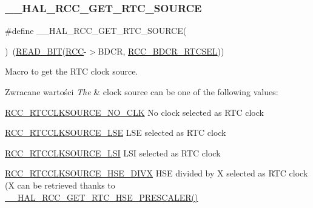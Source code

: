 \subsubsection{\texorpdfstring{\+\_\+\+\_\+\+H\+A\+L\+\_\+\+R\+C\+C\+\_\+\+G\+E\+T\+\_\+\+R\+T\+C\+\_\+\+S\+O\+U\+R\+CE}{\_\_HAL\_RCC\_GET\_RTC\_SOURCE}}
{\footnotesize\ttfamily \#define \+\_\+\+\_\+\+H\+A\+L\+\_\+\+R\+C\+C\+\_\+\+G\+E\+T\+\_\+\+R\+T\+C\+\_\+\+S\+O\+U\+R\+CE(\begin{DoxyParamCaption}{ }\end{DoxyParamCaption})~(\hyperlink{group___exported__macro_ga822bb1bb9710d5f2fa6396b84e583c33}{R\+E\+A\+D\+\_\+\+B\+IT}(\hyperlink{group___peripheral__declaration_ga74944438a086975793d26ae48d5882d4}{R\+CC}-\/$>$B\+D\+CR, \hyperlink{group___peripheral___registers___bits___definition_gabe30dbd38f6456990ee641648bc05d40}{R\+C\+C\+\_\+\+B\+D\+C\+R\+\_\+\+R\+T\+C\+S\+EL}))}



Macro to get the R\+TC clock source. 


\begin{DoxyRetVals}{Zwracane wartości}
{\em The} & clock source can be one of the following values\+: \begin{DoxyItemize}
\item \hyperlink{group___r_c_c___r_t_c___clock___source_gacce0b2f54d103340d8c3a218e86e295d}{R\+C\+C\+\_\+\+R\+T\+C\+C\+L\+K\+S\+O\+U\+R\+C\+E\+\_\+\+N\+O\+\_\+\+C\+LK} No clock selected as R\+TC clock \item \hyperlink{group___r_c_c___r_t_c___clock___source_ga5dca8d63f250a20bd6bc005670d0c150}{R\+C\+C\+\_\+\+R\+T\+C\+C\+L\+K\+S\+O\+U\+R\+C\+E\+\_\+\+L\+SE} L\+SE selected as R\+TC clock \item \hyperlink{group___r_c_c___r_t_c___clock___source_gab47a1afb8b5eef9f20f4772961d0a5f4}{R\+C\+C\+\_\+\+R\+T\+C\+C\+L\+K\+S\+O\+U\+R\+C\+E\+\_\+\+L\+SI} L\+SI selected as R\+TC clock \item \hyperlink{group___r_c_c___r_t_c___clock___source_ga2e3715826835647795863c32f9aebad7}{R\+C\+C\+\_\+\+R\+T\+C\+C\+L\+K\+S\+O\+U\+R\+C\+E\+\_\+\+H\+S\+E\+\_\+\+D\+I\+VX} H\+SE divided by X selected as R\+TC clock (X can be retrieved thanks to \hyperlink{group___r_c_c___internal___r_t_c___clock___configuration_ga85dc62f0fcb14981c47d7f7da25e26d6}{\+\_\+\+\_\+\+H\+A\+L\+\_\+\+R\+C\+C\+\_\+\+G\+E\+T\+\_\+\+R\+T\+C\+\_\+\+H\+S\+E\+\_\+\+P\+R\+E\+S\+C\+A\+L\+E\+R()} \end{DoxyItemize}
\\
\hline
\end{DoxyRetVals}


